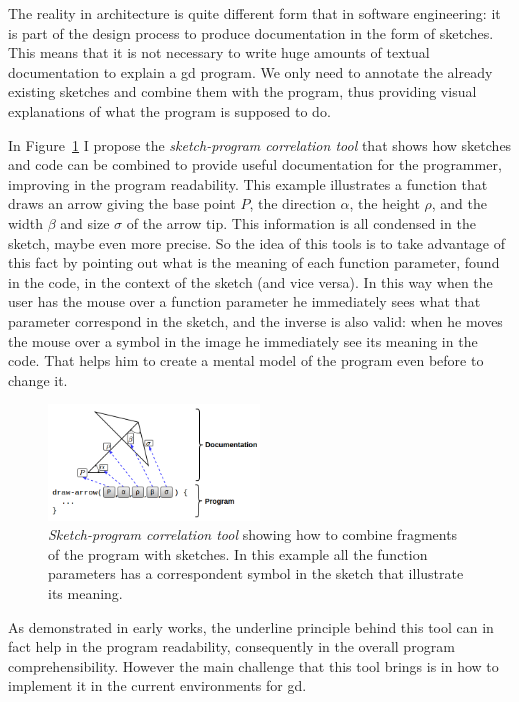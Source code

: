 The reality in architecture is quite different form that in software engineering: it is part of the design process to produce documentation in the form of sketches. This means that it is not necessary to write huge amounts of textual documentation to explain a \gls{gd} program. We only need to annotate the already existing sketches and combine them with the program, thus providing visual explanations of what the program is supposed to do.

In Figure~\ref{fig:sc-tool} I propose the \textit{sketch-program correlation tool} that shows how sketches and code can be combined to provide useful documentation for the programmer, improving in the program readability. This example illustrates a function that draws an arrow giving the base point $P$, the direction $\alpha$, the height $\rho$, and the width $\beta$ and size $\sigma$ of the arrow tip. This information is all condensed in the sketch, maybe even more precise. So the idea of this tools is to take advantage of this fact by pointing out what is the meaning of each function parameter, found in the code, in the context of the sketch (and vice versa). In this way when the user has the mouse over a function parameter he immediately sees what that parameter correspond in the sketch, and  the inverse is also valid: when he moves the mouse over a symbol in the image he immediately see its meaning in the code. That helps him to create a mental model of the program even before to change it.

\begin{figure}[!htbp]
  \centering
  \includegraphics[width=0.5\textwidth]{images/proposed-sc-tool}
    \caption{\textit{Sketch-program correlation tool} showing how to combine fragments of the program with sketches. In this example all the function parameters has a correspondent symbol in the sketch that illustrate its meaning.}
  \label{fig:sc-tool}
\end{figure}

As demonstrated in early works, the underline principle behind this tool can in fact help in the program readability, consequently in the overall program comprehensibility. However the main challenge that this tool brings is in how to implement it in the current  environments for \gls{gd}. 



